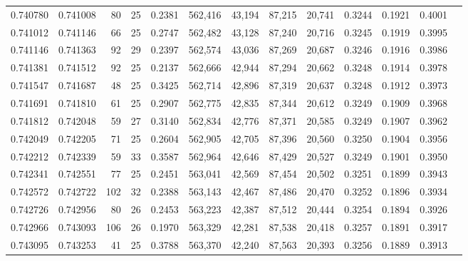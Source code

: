 \begin{tabular}{rrrrrrrrrrrrr}
0.740780 & 0.741008 &    80 &  25 &                                     0.2381 & 562,416 &  43,194 &  87,215 &  20,741 & 0.3244 & 0.1921 & 0.4001 \\
0.741012 & 0.741146 &    66 &  25 &                                     0.2747 & 562,482 &  43,128 &  87,240 &  20,716 & 0.3245 & 0.1919 & 0.3995 \\
0.741146 & 0.741363 &    92 &  29 &                                     0.2397 & 562,574 &  43,036 &  87,269 &  20,687 & 0.3246 & 0.1916 & 0.3986 \\
0.741381 & 0.741512 &    92 &  25 &                                     0.2137 & 562,666 &  42,944 &  87,294 &  20,662 & 0.3248 & 0.1914 & 0.3978 \\
0.741547 & 0.741687 &    48 &  25 &                                     0.3425 & 562,714 &  42,896 &  87,319 &  20,637 & 0.3248 & 0.1912 & 0.3973 \\
0.741691 & 0.741810 &    61 &  25 &                                     0.2907 & 562,775 &  42,835 &  87,344 &  20,612 & 0.3249 & 0.1909 & 0.3968 \\
0.741812 & 0.742048 &    59 &  27 &                                     0.3140 & 562,834 &  42,776 &  87,371 &  20,585 & 0.3249 & 0.1907 & 0.3962 \\
0.742049 & 0.742205 &    71 &  25 &                                     0.2604 & 562,905 &  42,705 &  87,396 &  20,560 & 0.3250 & 0.1904 & 0.3956 \\
0.742212 & 0.742339 &    59 &  33 &                                     0.3587 & 562,964 &  42,646 &  87,429 &  20,527 & 0.3249 & 0.1901 & 0.3950 \\
0.742341 & 0.742551 &    77 &  25 &                                     0.2451 & 563,041 &  42,569 &  87,454 &  20,502 & 0.3251 & 0.1899 & 0.3943 \\
0.742572 & 0.742722 &   102 &  32 &                                     0.2388 & 563,143 &  42,467 &  87,486 &  20,470 & 0.3252 & 0.1896 & 0.3934 \\
0.742726 & 0.742956 &    80 &  26 &                                     0.2453 & 563,223 &  42,387 &  87,512 &  20,444 & 0.3254 & 0.1894 & 0.3926 \\
0.742966 & 0.743093 &   106 &  26 &                                     0.1970 & 563,329 &  42,281 &  87,538 &  20,418 & 0.3257 & 0.1891 & 0.3917 \\
0.743095 & 0.743253 &    41 &  25 &                                     0.3788 & 563,370 &  42,240 &  87,563 &  20,393 & 0.3256 & 0.1889 & 0.3913 \\

\end{tabular}
